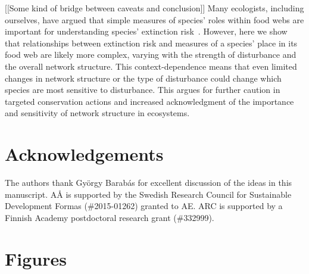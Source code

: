 \documentclass[12pt]{article}
\begin{document}
\begin{spacing}{2.0}
    
    
    [[Some kind of bridge between caveats and conclusion]]
    Many ecologists, including ourselves, have argued that simple measures of species' roles within food webs are important for understanding species' extinction risk~\citep{Santos2021,curtsdotter2011robustness, dunne2009cascading, Eklof2006,binzer2011susceptibility}. 
    However, here we show that relationships between extinction risk and measures of a species' place in its food web are likely more complex, varying with the strength of disturbance and the overall network structure.
    This context-dependence means that even limited changes in network structure or the type of disturbance could change which species are most sensitive to disturbance. 
    This argues for further caution in targeted conservation actions and increased acknowledgment of the importance and sensitivity of network structure in ecosystems. 
    
\section*{Acknowledgements}

    The authors thank Gy\"{o}rgy Barab\'{a}s for excellent discussion of the ideas in this manuscript. A{\AA} is supported by the Swedish Research Council for Sustainable Development Formas (\#2015-01262) granted to AE. ARC is supported by a Finnish Academy postdoctoral research grant (\#332999).

\clearpage    

\section*{Figures}
    


\end{spacing}
\end{document}

